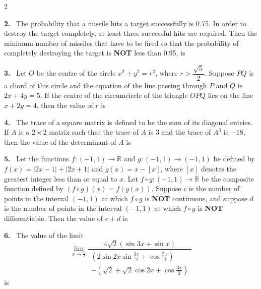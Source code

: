 \documentclass[10pt]{extarticle}
\newcommand{\qn}[1]{\par\smallskip\noindent\textbf{#1.}~}
\begin{document}
\begin{multicols}{2}
\qn{2} The probability that a missile hits a target successfully is 0.75. In order to destroy the target completely, at least three successful hits are required. Then the minimum number of missiles that have to be fired so that the probability of completely destroying the target is \textbf{NOT} less than 0.95, is \underline{\hspace{1cm}}

\qn{3} Let $O$ be the centre of the circle $x^2+y^2=r^2$, where $r>\dfrac{\sqrt5}2$. Suppose $PQ$ is a chord of this circle and the equation of the line passing through $P$ and $Q$ is $2x+4y=5$. If the centre of the circumcircle of the triangle $OPQ$ lies on the line $x+2y=4$, then the value of $r$ is \underline{\hspace{1cm}}

\qn{4} The trace of a square matrix is defined to be the sum of its diagonal entries. If $A$ is a $2\times2$ matrix such that the trace of $A$ is 3 and the trace of $A^3$ is $-18$, then the value of the determinant of $A$ is \underline{\hspace{1cm}}

\qn{5} Let the functions $f:(-1,1)\to\mathbb R$ and $g:(-1,1)\to(-1,1)$ be defined by $f(x)=|2x-1|+|2x+1|$ and $g(x)=x-[x]$, where $[x]$ denotes the greatest integer less than or equal to $x$. Let $f\circ g:(-1,1)\to\mathbb R$ be the composite function defined by $(f\circ g)(x)=f(g(x))$. Suppose $c$ is the number of points in the interval $(-1,1)$ at which $f\circ g$ is \textbf{NOT} continuous, and suppose $d$ is the number of points in the interval $(-1,1)$ at which $f\circ g$ is \textbf{NOT} differentiable. Then the value of $c+d$ is \underline{\hspace{1cm}}

\qn{6} The value of the limit
\[\lim_{x\to\frac\pi2}\dfrac{4\sqrt2(\sin3x+\sin x)}{\begin{array}{c}\left(2\sin2x\sin\frac{3x}2+\cos\frac{5x}2\right)\\[2pt]-\left(\sqrt2+\sqrt2\cos2x+\cos\frac{3x}2\right)\end{array}}\]
is \underline{\hspace{1cm}}
\end{multicols}
\end{document}
